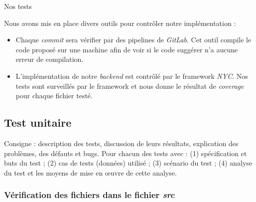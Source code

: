 \newenvironment{mytest}[4]
{
    \begin{center}
        \centering
        \begin{tabular}[h]{|m{4cm}|m{12cm}|} 
            \hline
            \rowcolor[HTML]{F8B400}
            \textbf{But} & #1 \\
            \hline
            \hline
            \rowcolor[HTML]{F7F7F7}
            Entrée & #2 \\
            \hline
            \rowcolor[HTML]{F7F7F7}
            Scénario & #3 \\
            \hline
            \rowcolor[HTML]{F7F7F7}
            Analyse du test & #4 \\
            \hline
        \end{tabular}
    \end{center}  
}

\section{Nos tests}

Nous avons mis en place divers outils pour contrôler notre implémentation :
\begin{itemize}
    \item Chaque \emph{commit} sera vérifier par des pipelines de \emph{GitLab}. Cet outil compile le code proposé sur une machine afin de voir si le code suggérer n'a aucune erreur de compilation.
    \item L'implémentation de notre \emph{backend} est contrôlé par le framework \emph{NYC}. Nos tests sont surveillés par le framework et nous donne le résultat de \emph{coverage} pour chaque fichier testé.
\end{itemize}

\subsection{Test unitaire}

Consigne : description des tests, discussion de leurs résultats, explication des problèmes, des défauts et bugs. Pour chacun des tests avec : (1) spécification et buts du test ;
(2) cas de tests (données) utilisé ; (3) scénario du test ; (4) analyse du test et les moyens de mise en œuvre de cette analyse.

\subsubsection{Vérification des fichiers dans le fichier \emph{src}}

